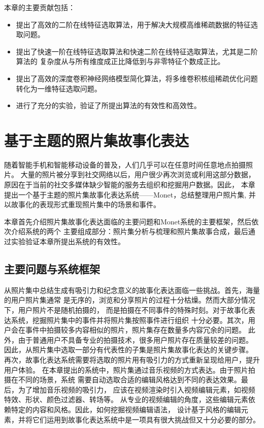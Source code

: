 \documentclass[doctor]{ustcthesis}
\begin{document}
本章的主要贡献包括：
\vspace{-0.5em}
\begin{itemize}\setlength{\itemsep}{0em}
    \item 提出了高效的二阶在线特征选取算法，用于解决大规模高维稀疏数据的特征选取问题。
    \item 提出了快速一阶在线特征选取算法和快速二阶在线特征选取算法，尤其是二阶算法的
        复杂度从与所有维度成正比降低到与非零特征个数成正比。
    \item 提出了高效的深度卷积神经网络模型简化算法，将多维卷积核组稀疏优化问题转化为一维特征选取问题。
    \item 进行了充分的实验，验证了所提出算法的有效性和高效性。
\end{itemize}


\chapter{基于主题的照片集故事化表达}
随着智能手机和智能移动设备的普及，人们几乎可以在任意时间任意地点拍摄照片。
大量的照片被分享到社交网络以后，用户很少再次浏览或利用这部分数据，
原因在于当前的社交多媒体缺少智能的服务去组织和挖掘用户数据。因此，
本章提出一个基于主题的照片集故事化表达系统——Monet，总结整理用户照片集,
并以故事化的表现形式重现照片集中的场景和事件。

本章首先介绍照片集故事化表达面临的主要问题和Monet系统的主要框架，然后依次介绍系统的两个
主要组成部分：照片集分析与梳理和照片集故事合成，最后通过实验验证本章所提出系统的有效性。

\section{主要问题与系统框架}
从照片集中总结生成有吸引力和纪念意义的故事化表达面临一些挑战。首先，海量的用户照片集通常
是无序的，浏览和分享照片的过程十分枯燥。然而大部分情况下，用户照片不是随机拍摄的，
而是拍摄在不同事件的特殊时刻。对于故事化表达系统，挖掘照片集中的事件并将照片集按照事件进行组织
十分必要。其次，用户会在事件中拍摄较多内容相似的照片，照片集存在数量多内容冗余的问题。
此外，由于普通用户不具备专业的拍摄技术，很多用户照片存在质量较差的问题。
因此，从照片集中选取一部分有代表性的子集是照片集故事化表达的关键步骤。
再次，故事化表达系统需要将选取的照片用有吸引力的方式重新呈现给用户，提升用户体验。
在本章提出的系统中，照片集通过音乐视频的方式表达。由于照片拍摄在不同的场景，系统
需要自动选取合适的编辑风格达到不同的表达效果。最后，为了增加音乐视频的吸引力，
应该在视频渲染时引入视频编辑元素，如视频特效、形状、颜色过滤器、转场等。
从专业的视频编辑的角度，这些编辑元素依赖特定的内容和风格。因此，如何挖掘视频编辑语法，
设计基于风格的编辑元素，并将它们运用到故事化表达系统中是一项具有很大挑战但又十分必要的部分。
\end{document}
